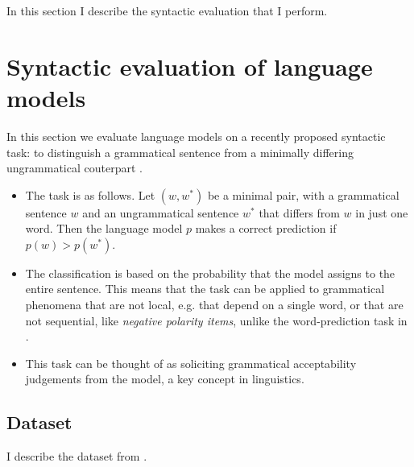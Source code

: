 % 

In this section I describe the syntactic evaluation that I perform.

\section{Syntactic evaluation of language models}
In this section we evaluate language models on a recently proposed syntactic task: to distinguish a grammatical sentence from a minimally differing ungrammatical couterpart \citep{Linzen+2018:targeted}.
\begin{itemize}
  \item The task is as follows. Let $(w, w^*)$ be a minimal pair, with a grammatical sentence $w$ and an ungrammatical sentence $w^*$ that differs from $w$ in just one word. Then the language model $p$ makes a correct prediction if $p(w) > p(w^*)$.
  \item The classification is based on the probability that the model assigns to the entire sentence. This means that the task can be applied to grammatical phenomena that are not local, e.g. that depend on a single word, or that are not sequential, like \textit{negative polarity items}, unlike the word-prediction task in \cite{Linzen+2016:LSTM-syntax}.
  \item This task can be thought of as soliciting grammatical acceptability judgements from the model, a key concept in linguistics.
\end{itemize}

\subsection{Dataset}
I describe the dataset from \citep{Linzen+2018:targeted}.

